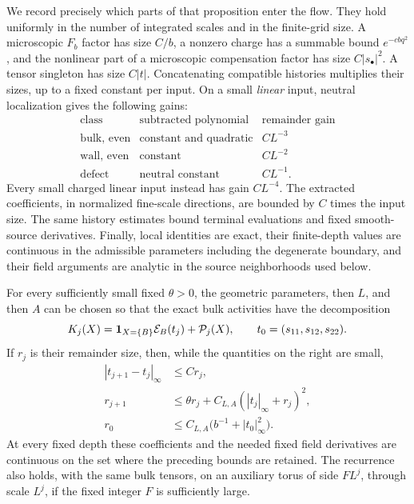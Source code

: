 We record precisely which parts of that proposition enter the flow.
They hold uniformly in the number of integrated scales and in the
finite-grid size.  A microscopic \(F_b\) factor has size \(C/b\), a
nonzero charge has a summable bound \(e^{-cbq^2}\), and the nonlinear
part of a microscopic compensation factor has size \(C|s_\bullet|^2\).
A tensor singleton has size \(C|t|\).  Concatenating compatible histories
multiplies their sizes, up to a fixed constant per input.  On a small
\emph{linear} input, neutral localization gives the following gains:
\[
 \begin{array}{c|c|c}
 \text{class}&\text{subtracted polynomial}&\text{remainder gain}\\ \hline
 \text{bulk, even}&\text{constant and quadratic}&CL^{-3}\\
 \text{wall, even}&\text{constant}&CL^{-2}\\
 \text{defect}&\text{neutral constant}&CL^{-1}.
 \end{array}
\]
Every small charged linear input instead has gain \(CL^{-4}\).
The extracted coefficients, in normalized fine-scale directions, are
bounded by \(C\) times the input size.  The same history estimates bound
terminal evaluations and fixed smooth-source derivatives.  Finally,
local identities are exact, their finite-depth values are continuous in
the admissible parameters including the degenerate boundary, and their
field arguments are analytic in the source neighborhoods used below.

\begin{proposition}\label{xyf:recurrence}
For every sufficiently small fixed \(\theta>0\), the geometric
parameters, then \(L\), and then \(A\) can be chosen so that the exact
bulk activities have the decomposition
\[
 K_j(X)=\mathbf 1_{X=\{B\}}\mathcal E_B(t_j)+\mathcal P_j(X),
 \qquad t_0=(s_{11},s_{12},s_{22}).
\]
If \(r_j\) is their remainder size, then, while the quantities on the
right are small,
\begin{align}
 |t_{j+1}-t_j|_\infty&\le C r_j,\label{xyf:increment}\\
 r_{j+1}&\le\theta r_j+C_{L,A}(|t_j|_\infty+r_j)^2,
       \label{xyf:remainder}\\
 r_0&\le C_{L,A}\bigl(b^{-1}+|t_0|_\infty^2\bigr).
       \label{xyf:initial}
\end{align}
At every fixed depth these coefficients and the needed fixed field
derivatives are continuous on the set where the preceding bounds are
retained.  The recurrence also holds, with the same bulk tensors,
on an auxiliary torus of side \(F L^j\), through scale \(L^j\), if
the fixed integer \(F\) is sufficiently large.
\end{proposition}

